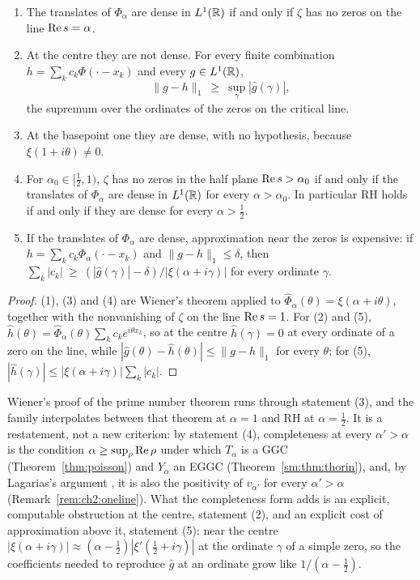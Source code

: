 \begin{proposition}\label{wr:prop:wiener}
\begin{enumerate}
\item The translates of $\Phi_\alpha$ are dense in $L^1(\mathbb{R})$ if and only if $\zeta$ has no zeros on the line $\operatorname{Re} s=\alpha$.
\item At the centre they are not dense. For every finite combination $h=\sum_kc_k\Phi(\cdot-x_k)$ and every $g\in L^1(\mathbb{R})$,
\[
\|g-h\|_1\ \ge\ \sup_\gamma|\hat g(\gamma)|,
\]
the supremum over the ordinates of the zeros on the critical line.
\item At the basepoint one they are dense, with no hypothesis, because $\xi(1+i\theta)\ne0$.
\item For $\alpha_0\in[\frac12,1)$, $\zeta$ has no zeros in the half plane $\operatorname{Re} s>\alpha_0$ if and only if the translates of $\Phi_\alpha$ are dense in $L^1(\mathbb{R})$ for every $\alpha>\alpha_0$. In particular RH holds if and only if they are dense for every $\alpha>\frac12$.
\item If the translates of $\Phi_\alpha$ are dense, approximation near the zeros is expensive: if $h=\sum_kc_k\Phi_\alpha(\cdot-x_k)$ and $\|g-h\|_1\le\delta$, then $\sum_k|c_k|\ \ge\ (|\hat g(\gamma)|-\delta)/|\xi(\alpha+i\gamma)|$ for every ordinate $\gamma$.
\end{enumerate}
\end{proposition}

\begin{proof}
(1), (3) and (4) are Wiener's theorem applied to $\hat\Phi_\alpha(\theta)=\xi(\alpha+i\theta)$, together with the nonvanishing of $\zeta$ on the line $\operatorname{Re} s=1$. For (2) and (5), $\hat h(\theta)=\hat\Phi_\alpha(\theta)\sum_kc_ke^{i\theta x_k}$, so at the centre $\hat h(\gamma)=0$ at every ordinate of a zero on the line, while $|\hat g(\theta)-\hat h(\theta)|\le\|g-h\|_1$ for every $\theta$; for (5), $|\hat h(\gamma)|\le|\xi(\alpha+i\gamma)|\sum_k|c_k|$.
\end{proof}

Wiener's proof of the prime number theorem runs through statement (3), and the family interpolates between that theorem at $\alpha=1$ and RH at $\alpha=\frac12$. It is a restatement, not a new criterion: by statement (4), completeness at every $\alpha'>\alpha$ is the condition $\alpha\ge\sup_\rho\operatorname{Re}\rho$ under which $T_\alpha$ is a GGC (Theorem~\ref{thm:poisson}) and $Y_\alpha$ an EGGC (Theorem~\ref{sm:thm:thorin}), and, by Lagarias's argument \cite{Lagarias}, it is also the positivity of $v_{\alpha'}$ for every $\alpha'>\alpha$ (Remark~\ref{rem:ch2:oneline}). What the completeness form adds is an explicit, computable obstruction at the centre, statement (2), and an explicit cost of approximation above it, statement (5): near the centre $|\xi(\alpha+i\gamma)|\approx(\alpha-\frac12)|\xi'(\frac12+i\gamma)|$ at the ordinate $\gamma$ of a simple zero, so the coefficients needed to reproduce $\hat g$ at an ordinate grow like $1/(\alpha-\frac12)$.

